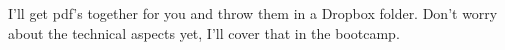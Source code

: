 \documentclass[12pt,letterpaper]{article} %
\begin{document}
I'll get pdf's together for you and throw them in a Dropbox folder.  Don't worry about the technical aspects yet, I'll cover that in the bootcamp. 





\setlength{\bibsep}{0.00cm plus 0.05cm} %


\end{document}
